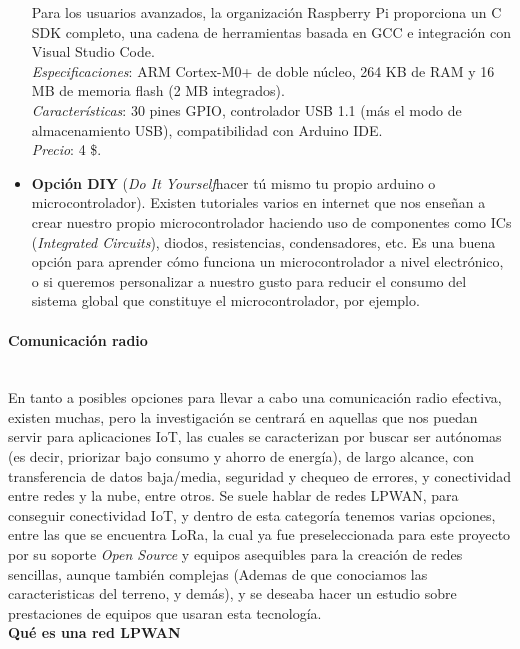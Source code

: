 \documentclass[12pt]{article}
\newcommand{\subsubsubsection}[1]{\paragraph{#1}\mbox{}\\}
\begin{document}
\begin{itemize}
		Para los usuarios avanzados, la organización Raspberry Pi proporciona un C SDK completo, una cadena de herramientas basada en GCC e integración con Visual Studio Code. \\
		
		\textit{Especificaciones}: ARM Cortex-M0+ de doble núcleo, 264 KB de RAM y 16 MB de memoria flash (2 MB integrados). \\
		
		\textit{Características}: 30 pines GPIO, controlador USB 1.1 (más el modo de almacenamiento USB), compatibilidad con Arduino IDE.\\
		
		\textit{Precio}: 4 \$.\\
		
		\item \textbf{Opción DIY} (\textit{Do It Yourself}hacer tú mismo tu propio arduino o microcontrolador). Existen tutoriales varios en internet que nos enseñan a crear nuestro propio microcontrolador haciendo uso de componentes como ICs (\textit{Integrated Circuits}), diodos, resistencias, condensadores, etc. Es una buena opción para aprender cómo funciona un microcontrolador a nivel electrónico, o si queremos personalizar a nuestro gusto para reducir el consumo del sistema global que constituye el microcontrolador, por ejemplo.\\

	\end{itemize}
	\subsubsubsection{Comunicación radio}
	
	\noindent En tanto a posibles opciones para llevar a cabo una comunicación radio efectiva, existen muchas, pero la investigación se centrará en aquellas que nos puedan servir para aplicaciones IoT, las cuales se caracterizan por buscar ser autónomas (es decir, priorizar bajo consumo y ahorro de energía), de largo alcance, con transferencia de datos baja/media, seguridad y chequeo de errores, y conectividad entre redes y la nube, entre otros. Se suele hablar de redes LPWAN, para conseguir conectividad IoT, y dentro de esta categoría tenemos varias opciones, entre las que se encuentra LoRa, la cual ya fue preseleccionada para este proyecto por su soporte \textit{Open Source} y equipos asequibles para la creación de redes sencillas, aunque también complejas (Ademas de que conociamos las caracteristicas del terreno, y demás), y se deseaba hacer un estudio sobre prestaciones de equipos que usaran esta tecnología.\\
	
	\noindent \textbf{Qué es una red LPWAN} \\
	
\end{document}
